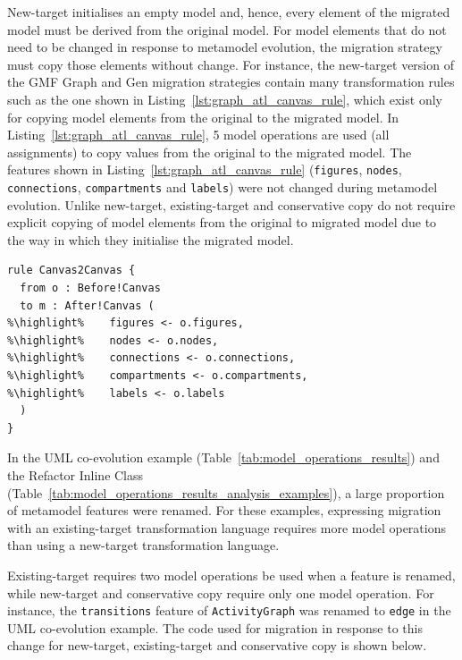 New-target initialises an empty model and, hence, every element of the migrated model must be derived from the original model. For model elements that do not need to be changed in response to metamodel evolution, the migration strategy must copy those elements without change. For instance, the new-target version of the GMF Graph and Gen migration strategies contain many transformation rules such as the one shown in Listing~\ref{lst:graph_atl_canvas_rule}, which exist only for copying model elements from the original to the migrated model. In Listing~\ref{lst:graph_atl_canvas_rule}, 5 model operations are used (all assignments) to copy values from the original to the migrated model. The features shown in Listing~\ref{lst:graph_atl_canvas_rule} (\texttt{fi\-gu\-r\-es}, \texttt{no\-d\-es}, \texttt{co\-nn\-ec\-ti\-o\-ns}, \texttt{co\-mp\-ar\-tm\-en\-ts} and \texttt{la\-be\-ls}) were not changed during metamodel evolution. Unlike new-target, existing-target and conservative copy do not require explicit copying of model elements from the original to migrated model due to the way in which they initialise the migrated model.

\begin{lstlisting}[float=tbp, caption=An extract of the GMF Graph model migration in ATL, label=lst:graph_atl_canvas_rule, language=ATL]
rule Canvas2Canvas {
  from o : Before!Canvas
  to m : After!Canvas (
%\highlight%    figures <- o.figures,
%\highlight%    nodes <- o.nodes,
%\highlight%    connections <- o.connections,
%\highlight%    compartments <- o.compartments,
%\highlight%    labels <- o.labels
  )
}
\end{lstlisting}

In the UML co-evolution example (Table~\ref{tab:model_operations_results}) and the Refactor Inline Class (Table~\ref{tab:model_operations_results_analysis_examples}), a large proportion of metamodel features were renamed. For these examples, expressing migration with an existing-target transformation language requires more model operations than using a new-target transformation language.

Existing-target requires two model operations be used when a feature is renamed, while new-target and conservative copy require only one model operation. For instance, the \texttt{transitions} feature of \texttt{ActivityGraph} was renamed to \texttt{edge} in the UML co-evolution example. The code used for migration in response to this change for new-target, existing-target and conservative copy is shown below. \\

